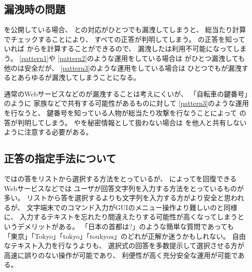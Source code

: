 \documentclass[twoside]{wiss}
\begin{document}

%
\subsection{{\PW}漏洩時の問題}

{\SQ}を公開している場合、
{\SS}と{\PW}の対応がひとつでも漏洩してしまうと、
総当たり計算でチェックすることにより、
すべて{\SQ}の正答が判明してしまう。
{\SQ}の正答を知っていれば
{\SS}から{\PW}を計算することができるので、
漏洩した{\SQ}は利用不可能になってしまう。
%
\ref{pattern1}や
\ref{pattern2}のような運用をしている場合は
{\PW}がひとつ漏洩しても他の{\PW}は安全だが、
\ref{pattern3}のような運用をしている場合は
ひとつでも{\PW}が漏洩するとあらゆる{\PW}が漏洩してしまうことになる。

通常のWebサービスなどの{\PW}が漏洩することは考えにくいが、
「自転車の鍵番号」のように
家族などで共有する可能性があるものに対して
\ref{pattern3}のような運用を行なうと、
鍵番号を知っている人物が総当たり攻撃を行なうことによって
{\SQ}の答が判明してしまう。
{\SS}や{\SQ}を秘密情報として扱わない場合は
{\PW}を他人と共有しないように注意する必要がある。

\subsection{正答の指定手法について}

{\EP}では{\SQ}の答をリストから選択する方法をとっているが、
{\SQ}によって{\PW}を回復できるWebサービスなどでは
ユーザが回答文字列を入力する方法をとっているものが多い。
リストから答を選択するよりも文字列を入力する方がより安全と思われるが、
文字端末でのコマンド入力がGUIのメニュー操作より難しいのと同様に、
入力するテキストを忘れたり間違えたりする可能性が高くなってしまうというデメリットがある。
「日本の首都は?」のような簡単な質問であっても
「東京」「Tokyo」「tokyo」「toukyou」のどれが正解か迷うかもしれない。
自由なテキスト入力を行なうよりも、
選択式の回答を多数提示して選択させる方が高速に誤りのない操作が可能であり、
利便性が高く充分安全な運用が可能である。

% 
% 
% 
% 
% 
\end{document}
